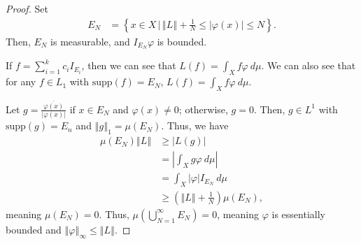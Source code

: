 \documentclass[12pt]{extarticle}
\newcommand{\norm}[1]{\left\Vert #1\right\Vert}
\newcommand{\set}[1]{\left\{#1\right\}}
\theoremstyle{plain}
\theoremstyle{definition}
\theoremstyle{note}
\renewcommand{\newline}{\hfill\break}
\begin{document}
\begin{proof}
  Set
  \begin{align*}
    E_N &= \set{x\in X\,\bigg|\,\norm{L} + \frac{1}{N} \leq \left\vert \varphi(x) \right\vert \leq N}.
  \end{align*}
  Then, $E_N$ is measurable, and $I_{E_N} \varphi$ is bounded.\newline

  If $f = \sum_{i=1}^{k}c_iI_{E_i}$, then we can see that $L(f) = \int_{X}f\varphi\:d\mu$. We can also see that for any $f\in L_1$ with $\text{supp}(f) = E_N$, $L(f) = \int_{X}f\varphi\:d\mu$.\newline

  Let $g = \frac{\overline{\varphi(x)}}{\left\vert \varphi(x) \right\vert}$ if $x\in E_N$ and $\varphi(x) \neq 0$; otherwise, $g = 0$. Then, $g\in L^1$ with $\text{supp}(g) = E_n$ and $\norm{g}_{1} = \mu(E_N)$. Thus, we have
  \begin{align*}
    \mu(E_N)\norm{L} &\geq \left\vert L(g) \right\vert\\
                     &= \left\vert \int_{X}^{} g\varphi\:d\mu \right\vert\\
                     &= \int_{X}^{} \left\vert \varphi \right\vert I_{E_N}\:d\mu\\
                     &\geq \left(\norm{L} + \frac{1}{N}\right)\mu\left(E_N\right),
  \end{align*}
  meaning $\mu(E_N) = 0$. Thus, $\mu\left(\bigcup_{N=1}^{\infty}E_N\right) = 0$, meaning $\varphi$ is essentially bounded and $\norm{\varphi}_{\infty}\leq \norm{L}$.
\end{proof}
\end{document}
